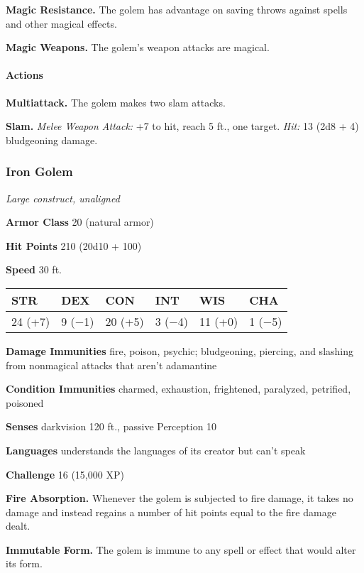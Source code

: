 \documentclass[
]{article}
\begin{document}
\textbf{Magic Resistance.} The golem has advantage on saving throws
against spells and other magical effects.

\textbf{Magic Weapons.} The golem's weapon attacks are magical.

\hypertarget{actions-17}{%
\paragraph{Actions}\label{actions-17}}

\textbf{Multiattack.} The golem makes two slam attacks.

\textbf{Slam.} \emph{Melee Weapon Attack:} +7 to hit, reach 5 ft., one
target. \emph{Hit:} 13 (2d8 + 4) bludgeoning damage.

\hypertarget{iron-golem}{%
\subsubsection{Iron Golem}\label{iron-golem}}

\emph{Large construct, unaligned}

\textbf{Armor Class} 20 (natural armor)

\textbf{Hit Points} 210 (20d10 + 100)

\textbf{Speed} 30 ft.

\begin{longtable}[]{@{}llllll@{}}
\toprule
STR & DEX & CON & INT & WIS & CHA\tabularnewline
\midrule
\endhead
24 (+7) & 9 (−1) & 20 (+5) & 3 (−4) & 11 (+0) & 1 (−5)\tabularnewline
\bottomrule
\end{longtable}

\textbf{Damage Immunities} fire, poison, psychic; bludgeoning, piercing,
and slashing from nonmagical attacks that aren't adamantine

\textbf{Condition Immunities} charmed, exhaustion, frightened,
paralyzed, petrified, poisoned

\textbf{Senses} darkvision 120 ft., passive Perception 10

\textbf{Languages} understands the languages of its creator but can't
speak

\textbf{Challenge} 16 (15,000 XP)

\textbf{Fire Absorption.} Whenever the golem is subjected to fire
damage, it takes no damage and instead regains a number of hit points
equal to the fire damage dealt.

\textbf{Immutable Form.} The golem is immune to any spell or effect that
would alter its form.
\end{document}

